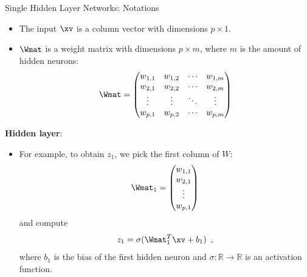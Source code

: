 \begin{vbframe}{Single Hidden Layer Networks: Notations}

\begin{itemize}
\item The input $\xv$ is a column vector with dimensions $p \times 1$. 
\item $\Wmat$ is a weight matrix with dimensions $p \times m$, where $m$ is the amount of hidden neurons:
$$\Wmat =
     \begin{pmatrix}
      w_{1,1} & w_{1,2} & \cdots & w_{1,m} \\
      w_{2,1} & w_{2,2} & \cdots & w_{2,m} \\
      \vdots  & \vdots  & \ddots & \vdots  \\
      w_{p,1} & w_{p,2} & \cdots & w_{p,m}
     \end{pmatrix}$$
     \end{itemize}
     \framebreak
     \textbf{Hidden layer}:
     \begin{itemize}
\item For example, to obtain $z_1$, we pick the first column of $W$:
    $$\Wmat_1 =
     \begin{pmatrix}
      w_{1,1} \\
      w_{2,1} \\
      \vdots  \\
      w_{p,1}
     \end{pmatrix}$$
and compute 
$$z_1 = \sigma(\Wmat_1^T \xv + b_1)\enspace,$$
 where $b_1$ is the bias of the first hidden neuron and $\sigma: \mathbb{R} \to \mathbb{R}$ is an activation function. 
\end{itemize}
\end{vbframe}

